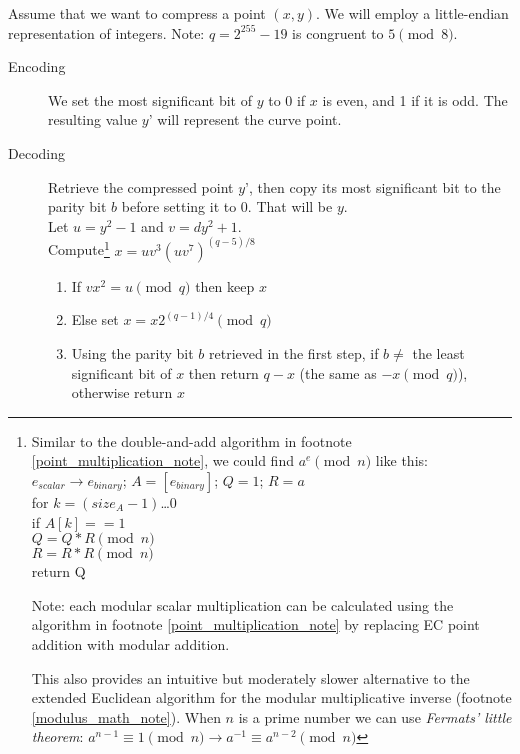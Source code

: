 Assume that we want to compress a point \((x, y)\).
We will employ a little-endian representation of integers. Note: $q = 2^{255}-19$ is congruent to $5 \pmod{8}$.

\begin{description}
	
	
	\item[Encoding] We set the most significant bit of $y$ to 0 if $x$ is even, and 1 if it is odd. The resulting value $y’$ will represent the curve point.
	
	\item[Decoding] Retrieve the compressed point $y’$, then copy its most significant bit to the parity bit $b$ before setting it to 0. That will be $y$. \\
	 Let \(u = y^2-1\) and \(v = d y^2  + 1\). \\
	 Compute\footnote{\label{exponent_algorithm_note}Similar to the double-and-add algorithm in footnote \ref{point_multiplication_note}, we could find $a^e \pmod{n}$ like this:
\newline
$e_{scalar} \rightarrow e_{binary}$; $A = [e_{binary}]$; $Q = 1$; $R = a$\\
for $k = (size_A - 1)$…0\\
\indent	if $A[k] == 1$\\
\indent \indent	$Q = Q*R \pmod{n}$\\
\indent	$R = R*R \pmod{n}$\\
return Q

Note: each modular scalar multiplication can be calculated using the algorithm in footnote \ref{point_multiplication_note} by replacing EC point addition with modular addition.

This also provides an intuitive but moderately slower alternative to the extended Euclidean algorithm for the modular multiplicative inverse (footnote \ref{modulus_math_note}). When $n$ is a prime number we can use {\em Fermats’ little theorem}: 
\center $a^{n-1} \equiv 1 \pmod{n} 	\rightarrow 	a^{-1} \equiv a^{n-2} \pmod{n}$} \(x = u v^3 (u v^7)^{(q-5)/8}\)
	 \begin{enumerate}
	 \item If \(v x^2 = u \pmod q\) then keep \(x\)
	 \item Else set \(x = x 2^{(q-1)/4} \pmod q\)
	 \item Using the parity bit \(b\) retrieved in the first step, if $b \ne$ the least significant bit of $x$ then return \(q - x\) (the same as $-x \pmod{q}$), otherwise return \(x\)
	 \end{enumerate}	
	
\end{description}

